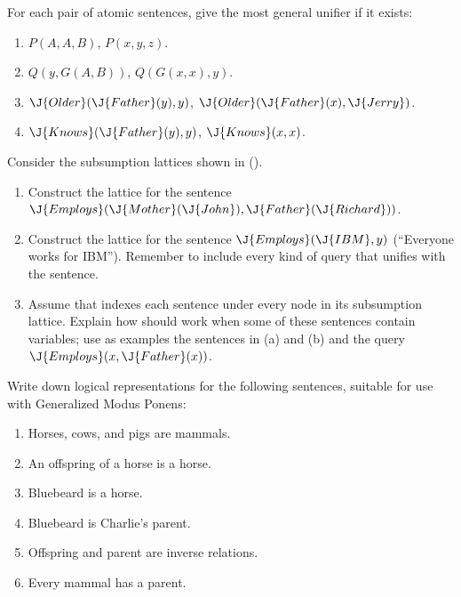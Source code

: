 \begin{iexercise}
For each pair of atomic sentences,
give the most 
 general unifier if it exists:
\begin{enumerate}
\item \(P(A,A,B)\), \(P(x,y,z)\).
\item \(Q(y,G(A,B))\), \(Q(G(x,x),y)\).
\item \(\J{Older}(\J{Father}(y),y)\), \(\J{Older}(\J{Father}(x),\J{Jerry})\).
\item \(\J{Knows}(\J{Father}(y),y)\), \(\J{Knows}(x,x)\).
\end{enumerate}
\end{iexercise} 

\begin{exercise}%
Consider the subsumption lattices shown in  ().
\begin{enumerate}
\item Construct the lattice for the sentence \(\J{Employs}(\J{Mother}(\J{John}),\J{Father}(\J{Richard}))\).
\item Construct the lattice for the sentence \(\J{Employs}(\J{IBM},y)\) (``Everyone works for IBM''). 
Remember to include every kind of query that unifies with the sentence.
\item Assume that  indexes each sentence under every node in its subsumption lattice.
Explain how  should work when some of these sentences
contain variables; use as examples the sentences in (a) and (b) and
the query \(\J{Employs}(x,\J{Father}(x))\).
\end{enumerate}
\end{exercise} 

\begin{exercise}%
Write down logical representations for the following
sentences, suitable for use with Generalized Modus Ponens:
\begin{enumerate}
\item Horses, cows, and pigs are mammals.
\item An offspring of a horse is a horse.
\item Bluebeard is a horse.
\item Bluebeard is Charlie's parent.
\item Offspring and parent are inverse relations.
\item Every mammal has a parent.
\end{enumerate}
\end{exercise} 

